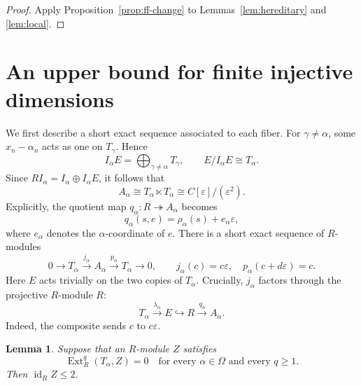\documentclass[11pt]{amsart}
\newtheorem{lemma}[theorem]{Lemma}
\theoremstyle{definition}
\DeclareMathOperator{\id}{id}
\DeclareMathOperator{\Ext}{Ext}
\newcommand{\eps}{\varepsilon}
\newcommand{\into}{\hookrightarrow}
\newcommand{\onto}{\twoheadrightarrow}
\numberwithin{equation}{section}
\begin{document}
\begin{proof}
Apply Proposition~\ref{prop:ff-change} to Lemmas~\ref{lem:hereditary}
and \ref{lem:local}.
\end{proof}

\section{An upper bound for finite injective dimensions}

We first describe a short exact sequence associated to each fiber.
For $\gamma\ne\alpha$, some $x_n-\alpha_n$ acts as one on
$T_\gamma$. Hence
\begin{equation}\label{eq:fiber-ideal}
 I_\alpha E=\bigoplus_{\gamma\ne\alpha}T_\gamma,
 \qquad E/I_\alpha E\cong T_\alpha.
\end{equation}
Since $RI_\alpha=I_\alpha\oplus I_\alpha E$, it follows that
\begin{equation}\label{eq:dual-number-fiber}
 A_\alpha\cong T_\alpha\ltimes T_\alpha
       \cong C[\eps]/(\eps^2).
\end{equation}
Explicitly, the quotient map $q_\alpha:R\onto A_\alpha$ becomes
\[
 q_\alpha(s,e)=\rho_\alpha(s)+e_\alpha\eps,
\]
where $e_\alpha$ denotes the $\alpha$-coordinate of $e$.
There is a short exact sequence of $R$-modules
\begin{equation}\label{eq:self-extension}
 0\longrightarrow T_\alpha\xrightarrow{j_\alpha}A_\alpha
   \xrightarrow{p_\alpha}T_\alpha\longrightarrow0,
 \qquad j_\alpha(c)=c\eps,\quad p_\alpha(c+d\eps)=c.
\end{equation}
Here $E$ acts trivially on the two copies of $T_\alpha$. Crucially,
$j_\alpha$ factors through the projective $R$-module $R$:
\begin{equation}\label{eq:j-factorization}
 T_\alpha\xrightarrow{\lambda_\alpha}E\into R
     \xrightarrow{q_\alpha}A_\alpha.
\end{equation}
Indeed, the composite sends $c$ to $c\eps$.

\begin{lemma}\label{lem:injective-test}
Suppose that an $R$-module $Z$ satisfies
\[
 \Ext_R^q(T_\alpha,Z)=0
       \quad\text{for every $\alpha\in\Omega$ and every $q\geq1$}.
\]
Then $\id_R Z\leq2$.
\end{lemma}
\end{document}
